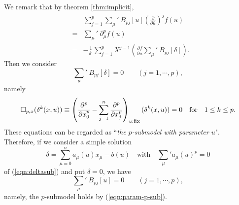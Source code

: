 \documentclass[makeidx,12pt,openany]{report}
\begin{document}
We remark that by theorem \ref{thm:implicit}, 
\begin{eqnarray}
 &&\sum_{j=1}^p \sum_{\mu}{}'\ B_{pj}[u]
  \left( \frac{\partial}{\partial \bar{u}} \right)^j f(u) \nonumber\\
 &=&\sum_{\mu}{}'\ \partial_{\mu}^p f(u) \nonumber\\
 &=&-\frac{1}{\delta'} \sum_{j=1}^p X^{j-1}
     \left( \frac{\partial f}{\partial u}
      \sum_{\mu}{}'\ B_{pj}[\delta ] \right) \label{eqn:param-p-sub}.
\end{eqnarray}
Then we consider 
\begin{equation}
 \sum_{\mu}{}'\ B_{pj}[\delta ]=0 \qquad (j=1,\cdots,p),
\end{equation}
namely
\begin{equation}
\square_{p,x} (\delta^k(x,u)) \equiv 
  \left(
   \frac{\partial^p}{\partial x_0^p}
   -\sum_{j=1}^n \frac{\partial^p}{\partial x_j^p}
  \right)_{u:\mbox{\footnotesize{fix}}}(\delta^k(x,u))=0 
   \quad \mbox{for} \quad 1 \le k \le p 
   \label{eqn:deltasub}.
\end{equation}
These equations can be regarded as ``{\textit{the $p$-submodel with 
parameter $u$}}". Therefore, if we consider a simple solution 
\begin{equation}
 \delta = \sum_{\mu =0}^n a_{\mu}(u)x_{\mu}-b(u)
\quad \mbox{with} \quad 
 \sum_{\mu}{}'a_{\mu}(u)^{p}=0
\end{equation}
of (\ref{eqn:deltasub}) and put $\delta =0$, we have 
\begin{equation}
 \sum_{\mu}{}'\ B_{pj}[u]=0 \qquad (j=1,\cdots,p),
\end{equation}
namely, the $p$-submodel holds by (\ref{eqn:param-p-sub}). 
\end{document}

